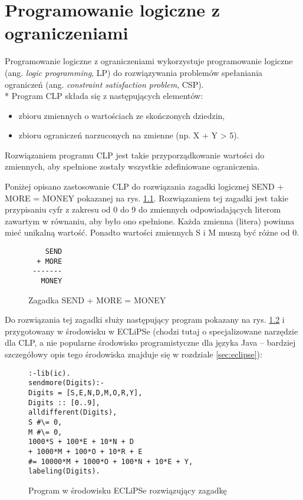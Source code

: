 \chapter{Programowanie logiczne z ograniczeniami}

\label{sec:clp}

Programowanie logiczne z ograniczeniami \cite{CLP} wykorzystuje programowanie logiczne (ang. \textit{logic programming}, LP) do rozwiązywania problemów spełaniania ograniczeń (ang. \textit{constraint satisfaction problem}, CSP). 
\\*
Program CLP składa się z następujących elementów:
\begin{itemize}
\item{zbioru zmiennych o wartościach ze skończonych dziedzin,}
\item{zbioru ograniczeń narzuconych na zmienne (np. X + Y > 5).}
\end{itemize}

Rozwiązaniem programu CLP jest takie przyporządkowanie wartości do zmiennych, aby spełnione zostały wszystkie zdefiniowane ograniczenia.

Poniżej opisano zastosowanie CLP do rozwiązania zagadki logicznej SEND + MORE  = MONEY \cite{Eclipse} pokazanej na rys. \ref{fig:sendmoremoney}. Rozwiązaniem tej zagadki jest takie przypisaniu cyfr z zakresu od 0 do 9 do zmiennych odpowiadających literom zawartym w równaniu, aby było ono spełnione. Każda zmienna (litera) powinna mieć unikalną wartość. Ponadto wartości zmiennych S i M muszą być różne od 0.

\begin{figure}[H]
\begin{center}
\begin{verbatim}
    SEND
  + MORE
 -------
   MONEY
\end{verbatim}
\end{center}
\caption{Zagadka SEND + MORE = MONEY}
\label{fig:sendmoremoney}
\end{figure}

Do rozwiązania tej zagadki służy następujący program pokazany na rys. \ref{fig:eclipse_program} i przygotowany w środowisku w ECLiPSe (chodzi tutaj o specjalizowane narzędzie dla CLP, a nie popularne środowisko programistyczne dla języka Java -- bardziej szczegółowy opis tego środowiska znajduje się w rozdziale \ref{sec:eclipse}):

\begin{figure}[H]
\begin{verbatim}
:-lib(ic).
sendmore(Digits):-
Digits = [S,E,N,D,M,O,R,Y],
Digits :: [0..9],
alldifferent(Digits),
S #\= 0,
M #\= 0,
1000*S + 100*E + 10*N + D
+ 1000*M + 100*O + 10*R + E
#= 10000*M + 1000*O + 100*N + 10*E + Y,
labeling(Digits).
\end{verbatim}
\caption{Program w środowisku ECLiPSe rozwiązujący zagadkę}
\label{fig:eclipse_program}
\end{figure}


